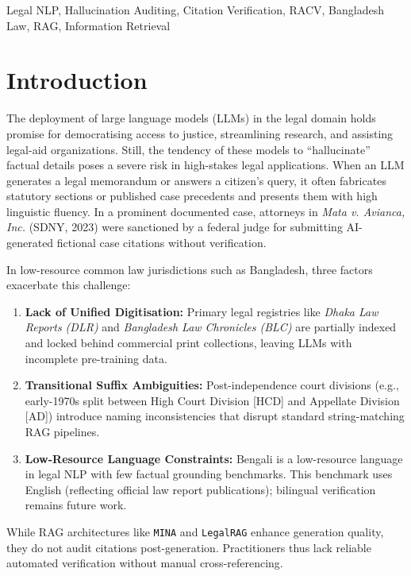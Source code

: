 \documentclass[conference]{IEEEtran}
\begin{document}
\begin{IEEEkeywords}
Legal NLP, Hallucination Auditing, Citation Verification, RACV, Bangladesh Law, RAG, Information Retrieval
\end{IEEEkeywords}

\section{Introduction}

The deployment of large language models (LLMs) in the legal domain holds promise for democratising access to justice, streamlining research, and assisting legal-aid organizations. Still, the tendency of these models to ``hallucinate'' factual details poses a severe risk in high-stakes legal applications. When an LLM generates a legal memorandum or answers a citizen's query, it often fabricates statutory sections or published case precedents and presents them with high linguistic fluency. In a prominent documented case, attorneys in \textit{Mata v. Avianca, Inc.} (SDNY, 2023) \cite{mata2023} were sanctioned by a federal judge for submitting AI-generated fictional case citations without verification.

In low-resource common law jurisdictions such as Bangladesh, three factors exacerbate this challenge:
\begin{enumerate}
\item \textbf{Lack of Unified Digitisation:} Primary legal registries like \textit{Dhaka Law Reports (DLR)} and \textit{Bangladesh Law Chronicles (BLC)} are partially indexed and locked behind commercial print collections, leaving LLMs with incomplete pre-training data.
\item \textbf{Transitional Suffix Ambiguities:} Post-independence court divisions (e.g., early-1970s split between High Court Division [HCD] and Appellate Division [AD]) introduce naming inconsistencies that disrupt standard string-matching RAG pipelines.
\item \textbf{Low-Resource Language Constraints:} Bengali is a low-resource language in legal NLP with few factual grounding benchmarks. This benchmark uses English (reflecting official law report publications); bilingual verification remains future work.
\end{enumerate}

While RAG architectures like \texttt{MINA} \cite{mina2026} and \texttt{LegalRAG} \cite{legalrag2025} enhance generation quality, they do not audit citations post-generation. Practitioners thus lack reliable automated verification without manual cross-referencing.
\end{document}
